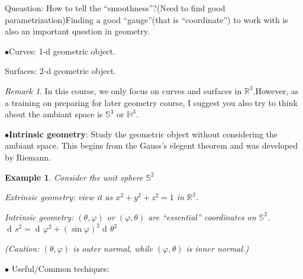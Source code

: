 \documentclass[UTF8,oneside,11pt]{book}
\DeclareMathOperator{\dd}{d\!}
\theoremstyle{plain}\newtheorem{thm}{Theorem}
\theoremstyle{definition}\newtheorem{defn}[thm]{Definition}
\theoremstyle{plain}\newtheorem{axiom}[thm]{Axiom}
\theoremstyle{plain}\newtheorem{coro}[thm]{Corollary}
\theoremstyle{plain}\newtheorem{lemma}[thm]{Lemma}
\theoremstyle{plain}\newtheorem{prop}[thm]{Proposition}
\theoremstyle{plain}\newtheorem{conj}[thm]{Conjecture}
\theoremstyle{plain}\newtheorem{ques}[thm]{Problem}
\theoremstyle{plain}\newtheorem{const}[thm]{Construction}
\theoremstyle{remark}\newtheorem{notation}[thm]{Notation}
\theoremstyle{plain}\newtheorem*{app}{Application}
\theoremstyle{plain}\newtheorem*{exam}{Example}
\theoremstyle{plain}\newtheorem*{exer}{Exercise}
\theoremstyle{remark}\newtheorem*{remark}{Remark}
\theoremstyle{remark}\newtheorem*{note}{\small{Note}}
\numberwithin{equation}{section}
\numberwithin{thm}{section}
\begin{document}
Queastion: How to tell the ``smoothness''?(Need to find good parametrization)Finding a good ``gauge''(that is ``coordinate'') to work with is also an important question in geometry.\par
$\bullet$Curves: 1-d geometric object.\par
Surfaces: 2-d geometric object.
\begin{remark}
    In this course, we only focus on curves and surfaces in $\mathbb{R}^3$.However, as a training on preparing for later geometry course, I suggest you also try to think about the ambiant space is $\mathbb{S}^3$ or $\mathbb{H}^3$.

\end{remark}
$\bullet$\textbf{Intrinsic geometry}: Study the geometric object without considering the ambiant space. This begins from the Gauss's elegent theorem and was developed by Riemann.
\begin{exam}
    Consider the unit sphere $\mathbb{S}^2$\par
    Extrinsic geometry: view it as $x^2+y^2+z^2=1$ in $\mathbb{R}^3$.\par
    Intrinsic geometry: $\left(\theta,\varphi\right)$ or $\left(\varphi,\theta\right)$ are ``essential'' coordinates on $\mathbb{S}^2$. $\dd s^2=\dd \varphi^2+\left(\sin\varphi\right)^2 \dd\theta^2$\par
    (Caution: $\left(\theta,\varphi\right)$ is outer normal, while $\left(\varphi,\theta\right)$ is inner normal.)
\end{exam}
$\bullet$ Useful/Common techiques:
\end{document}
